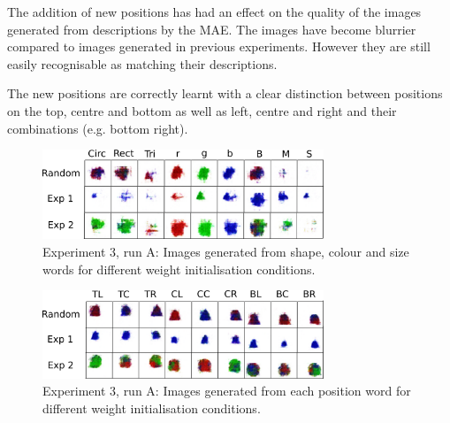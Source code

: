 The addition of new positions has had an effect on the quality of the images generated from descriptions by the MAE. The images have become blurrier compared to images generated in previous experiments. However they are still easily recognisable as matching their descriptions.

The new positions are correctly learnt with a clear distinction between positions on the top, centre and bottom as well as left, centre and right and their combinations (e.g. bottom right).

\begin{figure}[h]
\centering
\includegraphics[width=0.75\textwidth]{Figs/shapes/singlelabel339.png}
\caption{Experiment 3, run A: Images generated from shape, colour and size words for different weight initialisation conditions.}
\label{fig:339single}
\end{figure}

\begin{figure}[h]
\centering
\includegraphics[width=0.75\textwidth]{Figs/shapes/singlelabel339_pos.png}
\caption{Experiment 3, run A: Images generated from each position word for different weight initialisation conditions.}
\label{fig:339single_pos}
\end{figure}


